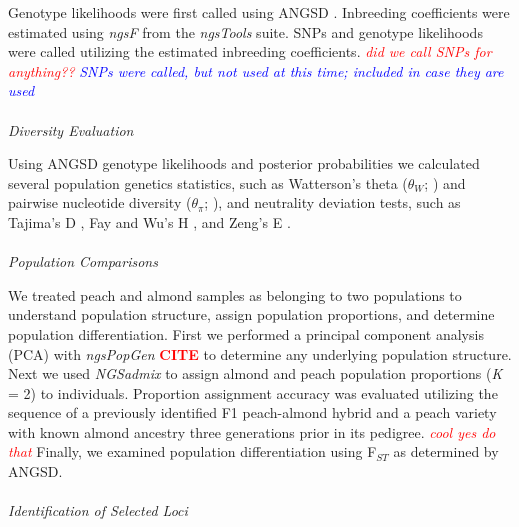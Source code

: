 \documentclass[12pt]{article}
\newcommand{\citex}{\textcolor{red}{\bf CITE }}
\newcommand{\jri}[1]{\textcolor{red}{\emph{#1}}}
\newcommand{\dv}[1]{\textcolor{blue}{\emph{#1}}}
\begin{document}
%
%
%
Genotype likelihoods were first called using ANGSD \citep{korneliussen2014angsd}.
%
Inbreeding coefficients were estimated using \emph{ngsF} from the \emph{ngsTools} \citep{fumagalli2014ngstools} suite.
%
SNPs and genotype likelihoods were called utilizing the estimated inbreeding coefficients. \jri{did we call SNPs for anything??} \dv{SNPs were called, but not used at this time; included in case they are used}
\\
%
\\
\emph{Diversity Evaluation}

Using ANGSD genotype likelihoods and posterior probabilities we calculated several population genetics statistics, such as Watterson's theta ($\theta_{W}$; \citealp{watterson1975number}) and pairwise nucleotide diversity ($\theta_{\pi}$; \citealp{nei1979mathematical}), and neutrality deviation tests, such as Tajima's D \citep{tajima1989statistical}, Fay and Wu's H \citep{fay2000hitchhiking}, and Zeng's E \citep{zeng2006statistical}.
\\
%
\\
\emph{Population Comparisons}

We treated peach and almond samples as belonging to two populations to understand population structure, assign population proportions, and determine population differentiation.
%
First we performed a principal component analysis (PCA) with \emph{ngsPopGen} \citex to determine any underlying population structure.
%
Next we used \emph{NGSadmix} \citep{skotte2013estimating} to assign almond and peach population proportions (\emph{K} = 2) to individuals. 
%
Proportion assignment accuracy was evaluated utilizing the sequence of a previously identified F1 peach-almond hybrid and a peach variety with known almond ancestry three generations prior in its pedigree. \jri{cool yes do that}
%
Finally, we examined population differentiation using F$_{ST}$ as determined by ANGSD.
%
\\
%
\\
\emph{Identification of Selected Loci}
\end{document}
